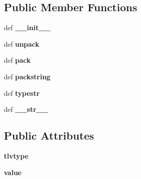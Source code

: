 \subsection*{Public Member Functions}
\begin{DoxyCompactItemize}
\item 
\hypertarget{classcore_1_1api_1_1coreapi_1_1_core_tlv_a779ee7ee8a0efad21df3094bc84d03c4}{def {\bfseries \+\_\+\+\_\+init\+\_\+\+\_\+}}\label{classcore_1_1api_1_1coreapi_1_1_core_tlv_a779ee7ee8a0efad21df3094bc84d03c4}

\item 
\hypertarget{classcore_1_1api_1_1coreapi_1_1_core_tlv_acc6e8bd8eaba95a12a5f63065abf3bb5}{def {\bfseries unpack}}\label{classcore_1_1api_1_1coreapi_1_1_core_tlv_acc6e8bd8eaba95a12a5f63065abf3bb5}

\item 
\hypertarget{classcore_1_1api_1_1coreapi_1_1_core_tlv_a235a0fd91839a1c3b29b0c8199ff7df3}{def {\bfseries pack}}\label{classcore_1_1api_1_1coreapi_1_1_core_tlv_a235a0fd91839a1c3b29b0c8199ff7df3}

\item 
\hypertarget{classcore_1_1api_1_1coreapi_1_1_core_tlv_abf3e7757b933719ab5d251dfed10a281}{def {\bfseries packstring}}\label{classcore_1_1api_1_1coreapi_1_1_core_tlv_abf3e7757b933719ab5d251dfed10a281}

\item 
\hypertarget{classcore_1_1api_1_1coreapi_1_1_core_tlv_aa5801d1cd687397c54af1256c37054a5}{def {\bfseries typestr}}\label{classcore_1_1api_1_1coreapi_1_1_core_tlv_aa5801d1cd687397c54af1256c37054a5}

\item 
\hypertarget{classcore_1_1api_1_1coreapi_1_1_core_tlv_ac0c84cff2ebb31c14ec1ccde0f8695c0}{def {\bfseries \+\_\+\+\_\+str\+\_\+\+\_\+}}\label{classcore_1_1api_1_1coreapi_1_1_core_tlv_ac0c84cff2ebb31c14ec1ccde0f8695c0}

\end{DoxyCompactItemize}
\subsection*{Public Attributes}
\begin{DoxyCompactItemize}
\item 
\hypertarget{classcore_1_1api_1_1coreapi_1_1_core_tlv_a9bac9cdaa98a93b0ac70f644b60eb8ff}{{\bfseries tlvtype}}\label{classcore_1_1api_1_1coreapi_1_1_core_tlv_a9bac9cdaa98a93b0ac70f644b60eb8ff}

\item 
\hypertarget{classcore_1_1api_1_1coreapi_1_1_core_tlv_ad4e2905d9bb946acc01b00b6bb816cd8}{{\bfseries value}}\label{classcore_1_1api_1_1coreapi_1_1_core_tlv_ad4e2905d9bb946acc01b00b6bb816cd8}

\end{DoxyCompactItemize}

